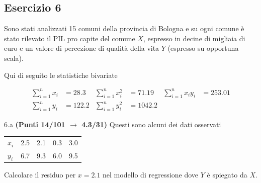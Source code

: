 \documentclass[
  11pt,
]{book}
\theoremstyle{mytheoremstyle}
\theoremstyle{mydefstyle}
\begin{document}
\subsection{Esercizio 6}\label{esercizio-6-16}

Sono stati analizzati 15 comuni della provincia di Bologna e su ogni comune è stato rilevato
il PIL pro capite del comune \(X\), espresso in decine di migliaia di euro e un valore di percezione di
qualità della vita \(Y\) (espresso su opportuna scala).

Qui di seguito le statistiche bivariate

\begin{align}
  \sum_{i=1}^n x_i &= 28.3 &\sum_{i=1}^n x_i^2 &= 71.19 &\sum_{i=1}^n x_i y_i &= 253.01\\
  \sum_{i=1}^n y_i &= 122.2 & \sum_{i=1}^n y_i^2 &= 1042.2 &
\end{align}

6.a \textbf{(Punti 14/101 \(\rightarrow\) 4.3/31)} Questi sono alcuni dei dati osservati

\begin{table}[H]
\centering
\begin{tabular}{lrrrr}
\toprule
  &  &  &  & \\
\midrule
$x_i$ & 2.5 & 2.1 & 0.3 & 3.0\\
$y_i$ & 6.7 & 9.3 & 6.0 & 9.5\\
\bottomrule
\end{tabular}
\end{table}

Calcolare il residuo per \(x=2.1\) nel modello di regressione dove \(Y\) è spiegato da \(X\).
\end{document}
